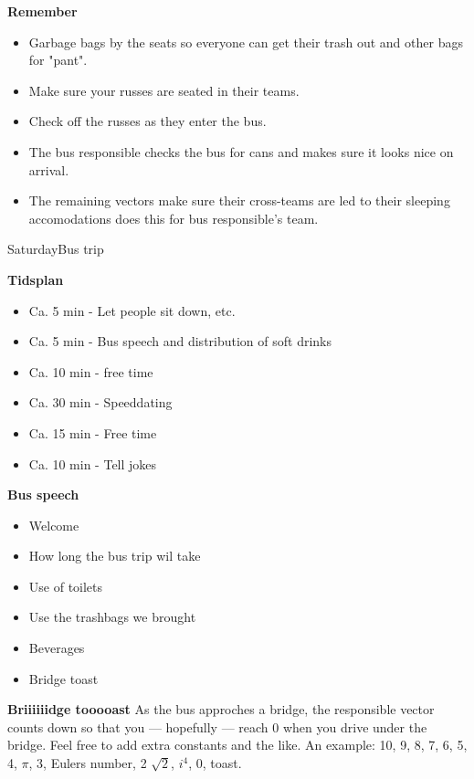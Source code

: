\documentclass[../../../main.tex]{subfiles}
\begin{document}
\textbf{Remember}
\begin{itemize}
    \item Garbage bags by the seats so everyone can get their trash out and other bags for "pant".
    \item Make sure your russes are seated in their teams.
    \item Check off the russes as they enter the bus.
    \item The bus responsible checks the bus for cans and makes sure it looks nice on arrival.
    \item The remaining vectors make sure their cross-teams are led to their sleeping accomodations \VEKTOREX does this for bus responsible's team.
\end{itemize}

\begin{mats}{Saturday}{Bus trip}
\end{mats}

\textbf{Tidsplan}
\begin{itemize}
    \item Ca. 5 min - Let people sit down, etc.
    \item Ca. 5 min - Bus speech and distribution of soft drinks
    \item Ca. 10 min - free time
    \item Ca. 30 min - Speeddating
    \item Ca. 15 min - Free time
    \item Ca. 10 min - Tell jokes
\end{itemize}

\textbf{Bus speech}
\begin{itemize}
    \item Welcome
    \item How long the bus trip wil take
    \item Use of toilets
    \item Use the trashbags we brought
    \item Beverages
    \item Bridge toast
\end{itemize}

\textbf{Briiiiiidge tooooast}
As the bus approches a bridge, the responsible vector counts down so that you --- hopefully --- reach 0 when you drive under the bridge. Feel free to add extra constants and the like. An example: 10, 9, 8, 7, 6, 5, 4, $\pi$, 3, Eulers number, 2 $\sqrt{2}$, $i^4$, 0, toast.
\end{document}
